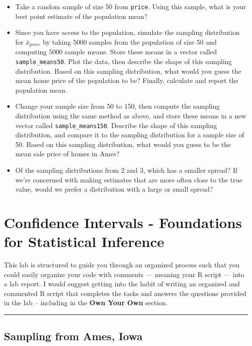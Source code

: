 \documentclass[]{book}
\theoremstyle{definition}
\theoremstyle{definition}
\theoremstyle{definition}
\theoremstyle{remark}
\begin{document}
\begin{itemize}
\item
  Take a random sample of size 50 from \texttt{price}. Using this
  sample, what is your best point estimate of the population mean?
\item
  Since you have access to the population, simulate the sampling
  distribution for \(\bar{x}_{price}\) by taking 5000 samples from the
  population of size 50 and computing 5000 sample means. Store these
  means in a vector called \texttt{sample\_means50}. Plot the data, then
  describe the shape of this sampling distribution. Based on this
  sampling distribution, what would you guess the mean home price of the
  population to be? Finally, calculate and report the population mean.
\item
  Change your sample size from 50 to 150, then compute the sampling
  distribution using the same method as above, and store these means in
  a new vector called \texttt{sample\_means150}. Describe the shape of
  this sampling distribution, and compare it to the sampling
  distribution for a sample size of 50. Based on this sampling
  distribution, what would you guess to be the mean sale price of homes
  in Ames?
\item
  Of the sampling distributions from 2 and 3, which has a smaller
  spread? If we're concerned with making estimates that are more often
  close to the true value, would we prefer a distribution with a large
  or small spread?
\end{itemize}

\chapter{Confidence Intervals - Foundations for Statistical
Inference}\label{confidence-intervals---foundations-for-statistical-inference}

This lab is structured to guide you through an organized process such
that you could easily organize your code with comments --- meaning your
R script --- into a lab report. I would suggest getting into the habit
of writing an organized and commented R script that completes the tasks
and answers the questions provided in the lab -- including in the
\textbf{Own Your Own} section.

\begin{center}\rule{0.5\linewidth}{\linethickness}\end{center}

\section{Sampling from Ames, Iowa}\label{sampling-from-ames-iowa}
\end{document}
